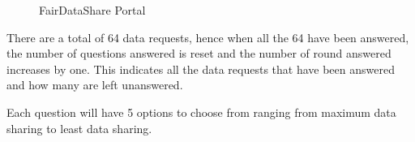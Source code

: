 \begin{figure}[htp]
  \hspace{1em}
  \caption{FairDataShare Portal}
  \label{fig:bid}
\end{figure}


There are a total of 64 data requests, hence when all the 64 have been answered, the number of questions answered is reset and the number of round answered increases by one. This indicates all the data requests that have been answered and how many are left unanswered. 

Each question will have 5 options to choose from ranging from maximum data sharing to least data sharing.

